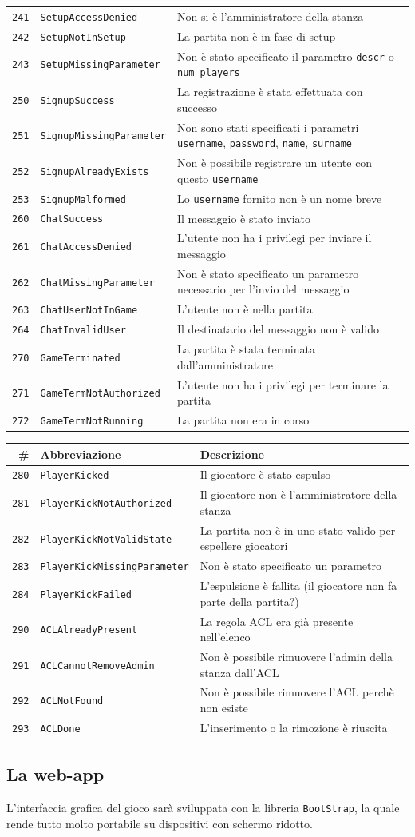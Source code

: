 \documentclass[10pt,a4paper]{article}
\newcommand{\apicode}[3]{
\texttt{#1} & \texttt{#2} & #3 \\
}
\begin{document}
{\begin{tabular}{|rl|l|}
\apicode{241}{SetupAccessDenied}{Non si è l'amministratore della stanza}
\apicode{242}{SetupNotInSetup}{La partita non è in fase di setup}
\apicode{243}{SetupMissingParameter}{Non è stato specificato il parametro \texttt{descr} o \texttt{num\_players}}
\hline
\apicode{250}{SignupSuccess}{La registrazione è stata effettuata con successo}
\apicode{251}{SignupMissingParameter}{Non sono stati specificati i parametri \texttt{username}, \texttt{password}, \texttt{name}, \texttt{surname}}
\apicode{252}{SignupAlreadyExists}{Non è possibile registrare un utente con questo \texttt{username}}
\apicode{253}{SignupMalformed}{Lo \texttt{username} fornito non è un nome breve}
\hline
\apicode{260}{ChatSuccess}{Il messaggio è stato inviato}
\apicode{261}{ChatAccessDenied}{L'utente non ha i privilegi per inviare il messaggio}
\apicode{262}{ChatMissingParameter}{Non è stato specificato un parametro necessario per l'invio del messaggio}
\apicode{263}{ChatUserNotInGame}{L'utente non è nella partita}
\apicode{264}{ChatInvalidUser}{Il destinatario del messaggio non è valido}
\hline
\apicode{270}{GameTerminated}{La partita è stata terminata dall'amministratore}
\apicode{271}{GameTermNotAuthorized}{L'utente non ha i privilegi per terminare la partita}
\apicode{272}{GameTermNotRunning}{La partita non era in corso}
\hline
\end{tabular}
}

\resizebox{\textwidth}{!} {
\begin{tabular}{|rl|l|}
\hline
\textbf{\#} & \textbf{Abbreviazione} & \textbf{Descrizione} \\
\hline
\apicode{280}{PlayerKicked}{Il giocatore è stato espulso}
\apicode{281}{PlayerKickNotAuthorized}{Il giocatore non è l'amministratore della stanza}
\apicode{282}{PlayerKickNotValidState}{La partita non è in uno stato valido per espellere giocatori}
\apicode{283}{PlayerKickMissingParameter}{Non è stato specificato un parametro}
\apicode{284}{PlayerKickFailed}{L'espulsione è fallita (il giocatore non fa parte della partita?)}
\hline
\apicode{290}{ACLAlreadyPresent}{La regola ACL era già presente nell'elenco}
\apicode{291}{ACLCannotRemoveAdmin}{Non è possibile rimuovere l'admin della stanza dall'ACL}
\apicode{292}{ACLNotFound}{Non è possibile rimuovere l'ACL perchè non esiste}
\apicode{293}{ACLDone}{L'inserimento o la rimozione è riuscita}
\hline
\end{tabular}
}

\subsection{La web-app}
L'interfaccia grafica del gioco sarà sviluppata con la libreria \texttt{BootStrap}, la quale rende tutto molto portabile su dispositivi con schermo ridotto. 
\end{document}
